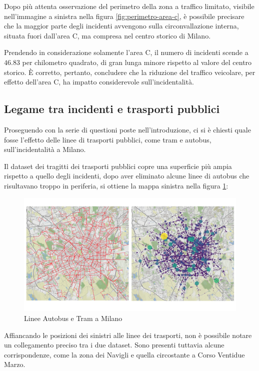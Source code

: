 \documentclass[a4paper,12pt]{report}
\begin{document}
Dopo più attenta osservazione del perimetro della zona a traffico limitato, 
visibile nell'immagine a sinistra nella 
figura \ref{fig:perimetro-area-c}, è possibile precisare che la maggior parte degli 
incidenti avvengono sulla circonvallazione interna, 
situata fuori dall'area C, ma compresa nel centro storico di Milano. 

Prendendo in considerazione solamente l'area C, il numero di incidenti scende a $46.83$ 
per chilometro quadrato, di gran lunga minore rispetto al valore del centro storico. 
\`E corretto, pertanto, concludere che la riduzione del traffico veicolare, per effetto 
dell'area C, ha impatto considerevole sull'incidentalità. 

\subsection{Legame tra incidenti e trasporti pubblici}

Proseguendo con la serie di questioni poste nell'introduzione, ci si è chiesti quale 
fosse l'effetto delle linee di trasporti pubblici, come tram e autobus, 
sull'incidentalità a Milano. 

Il dataset dei tragitti dei trasporti pubblici copre una superficie più ampia rispetto a 
quello degli incidenti, dopo aver eliminato alcune linee di autobus che risultavano 
troppo in periferia, si ottiene la mappa sinistra nella figura \ref{fig:geo-trasporti}: 

\begin{figure}
    \includegraphics[width=\linewidth]{../src/atm/linee_atm.png}
    \caption{Linee Autobus e Tram a Milano}
    \label{fig:geo-trasporti}
\end{figure}

Affiancando le posizioni dei sinistri alle linee dei trasporti, 
non è possibile notare un collegamento preciso tra i due dataset. 
Sono presenti tuttavia alcune corrispondenze, come la zona dei Navigli 
e quella circostante a Corso Ventidue Marzo. 
\end{document}
